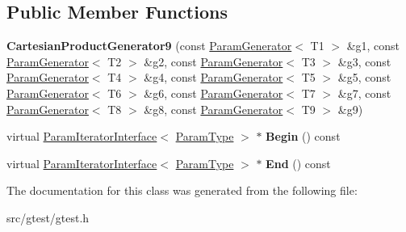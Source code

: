 \subsection*{Public Member Functions}
\begin{DoxyCompactItemize}
\item 
\mbox{\label{classtesting_1_1internal_1_1_cartesian_product_generator9_aff06c7992c06297c6bf5ad5eb56534e9}} 
{\bfseries Cartesian\+Product\+Generator9} (const \mbox{\hyperlink{classtesting_1_1internal_1_1_param_generator}{Param\+Generator}}$<$ T1 $>$ \&g1, const \mbox{\hyperlink{classtesting_1_1internal_1_1_param_generator}{Param\+Generator}}$<$ T2 $>$ \&g2, const \mbox{\hyperlink{classtesting_1_1internal_1_1_param_generator}{Param\+Generator}}$<$ T3 $>$ \&g3, const \mbox{\hyperlink{classtesting_1_1internal_1_1_param_generator}{Param\+Generator}}$<$ T4 $>$ \&g4, const \mbox{\hyperlink{classtesting_1_1internal_1_1_param_generator}{Param\+Generator}}$<$ T5 $>$ \&g5, const \mbox{\hyperlink{classtesting_1_1internal_1_1_param_generator}{Param\+Generator}}$<$ T6 $>$ \&g6, const \mbox{\hyperlink{classtesting_1_1internal_1_1_param_generator}{Param\+Generator}}$<$ T7 $>$ \&g7, const \mbox{\hyperlink{classtesting_1_1internal_1_1_param_generator}{Param\+Generator}}$<$ T8 $>$ \&g8, const \mbox{\hyperlink{classtesting_1_1internal_1_1_param_generator}{Param\+Generator}}$<$ T9 $>$ \&g9)
\item 
\mbox{\label{classtesting_1_1internal_1_1_cartesian_product_generator9_a5c6eab45aacb34bddfd8fa465ba5bd10}} 
virtual \mbox{\hyperlink{classtesting_1_1internal_1_1_param_iterator_interface}{Param\+Iterator\+Interface}}$<$ \mbox{\hyperlink{classstd_1_1tr1_1_1tuple}{Param\+Type}} $>$ $\ast$ {\bfseries Begin} () const
\item 
\mbox{\label{classtesting_1_1internal_1_1_cartesian_product_generator9_a841e8fa34ff2f3483ab098340747b7b9}} 
virtual \mbox{\hyperlink{classtesting_1_1internal_1_1_param_iterator_interface}{Param\+Iterator\+Interface}}$<$ \mbox{\hyperlink{classstd_1_1tr1_1_1tuple}{Param\+Type}} $>$ $\ast$ {\bfseries End} () const
\end{DoxyCompactItemize}


The documentation for this class was generated from the following file\+:\begin{DoxyCompactItemize}
\item 
src/gtest/gtest.\+h\end{DoxyCompactItemize}
